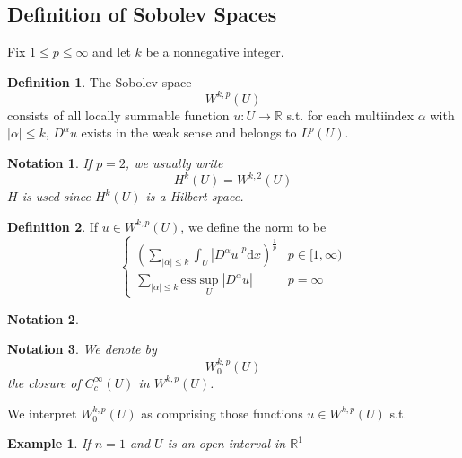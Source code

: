 \documentclass{article}
\newtheorem{notation}{Notation}
\newtheorem{example}{Example}[section]
\theoremstyle{definition}
\newtheorem{definition}{Definition}[section]
\begin{document}
\subsection{Definition of Sobolev Spaces}
Fix $1\le p\le \infty$ and let $k$ be a nonnegative integer. 
\begin{definition}
    The Sobolev space \[W^{k,p}(U)\] consists of all locally summable function $u:U\to\mathbb{R}$ s.t. for each multiindex $\alpha$ with $|\alpha|\le k$,
    $D^\alpha u$ exists in the weak sense and belongs to $L^p(U)$.
\end{definition}
\begin{notation}
    If $p=2$, we usually write \[H^k(U)=W^{k,2}(U)\] 
    $H$ is used since $H^k(U)$ is a Hilbert space.
\end{notation}

\begin{definition}
    If $u\in W^{k,p}(U)$, we define the norm to be 
    \begin{equation}
        \left\{\begin{matrix}
            (\sum_{|\alpha|\le k}\int_U |D^\alpha u|^p\mathrm{d}x)^{\frac{1}{p}}  & p\in [1,\infty)\\
             \sum_{|\alpha|\le k} \text{ess}\sup_U |D^\alpha u| & p=\infty
            \end{matrix}\right.            
    \end{equation}
\end{definition}

\begin{notation}
    
\end{notation}

\begin{notation}
    We denote by \[W_0^{k,p}(U)\] the closure of $C_c^\infty(U)$ in $W^{k,p}(U)$.
\end{notation}
We interpret $W_0^{k,p}(U)$ as comprising those functions $u\in W^{k,p}(U)$ s.t. 

\begin{example}
    If $n=1$ and $U$ is an open interval in $\mathbb{R}^1$
\end{example}
\end{document}
